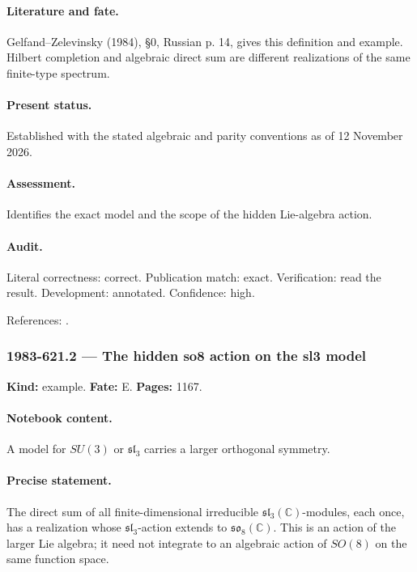 \paragraph{Literature and fate.} Gelfand–Zelevinsky (1984), \S0, Russian p. 14, gives this definition and example. Hilbert completion and algebraic direct sum are different realizations of the same finite-type spectrum.

\paragraph{Present status.} Established with the stated algebraic and parity conventions as of 12 November 2026.

\paragraph{Assessment.} Identifies the exact model and the scope of the hidden Lie-algebra action.

\paragraph{Audit.} Literal correctness: correct. Publication match: exact. Verification: read the result. Development: annotated. Confidence: high.

\noindent References: \citep{gelfandzelevinsky1984models}.\par

\subsubsection{1983-621.2 --- The hidden so8 action on the sl3 model}

\label{item:1983-621.2}

\noindent\textbf{Kind:} example. \textbf{Fate:} E. \textbf{Pages:} 1167.\par

\paragraph{Notebook content.} A model for \(SU(3)\) or \(\mathfrak{sl}_3\) carries a larger orthogonal symmetry.

\paragraph{Precise statement.} The direct sum of all finite-dimensional irreducible \(\mathfrak{sl}_3(\mathbb C)\)-modules, each once, has a realization whose \(\mathfrak{sl}_3\)-action extends to \(\mathfrak{so}_8(\mathbb C)\). This is an action of the larger Lie algebra; it need not integrate to an algebraic action of \(SO(8)\) on the same function space.

